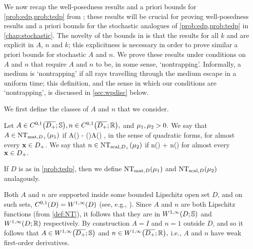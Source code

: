   We  now recap the well-posedness results and a priori bounds for \cref{prob:edp,prob:tedp} from \cite{GrPeSp:19}; these results will be crucial for proving well-posedness results and a priori bounds for the stochastic analogues of \cref{prob:edp,prob:tedp} in \cref{chap:stochastic}. The novelty of the bounds in \cite{GrPeSp:19} is that the results for all $k$ and are explicit in $A$, $n$ and $k$; this explicitness is necessary in order to prove similar a priori bounds for stochastic $A$ and $n$. We prove these results under conditions on $A$ and $n$ that require $A$ and $n$ to be, in some sense, `nontrapping'. Informally, a medium is `nontrapping' if all rays travelling through the medium escape in a uniform time; this definition, and the sense in which our conditions are `nontrapping', is discussed in \cref{sec:wpdisc} below.

  We first define the classes of $A$ and $n$ that we consider.%

  
\label{def:NT}
Let $A \in \CzoDpclosRRdtd, n \in \CzoDpclosRR,$ and $\mu_{1}, \mu_{2} > 0.$ We say that $A \in \NTADp{\muo}$ if
\beqs
A(\bx) - \mleft(\bx \cdot \grad\mright)A(\bx) \geq \muo,
\eeqs
in the sense of quadratic forms, for almost every $\mathbf{x} \in D_{+}$. We say that $n \in \NTnDp{\mut}$ if
\beqs
n(\bx) + \bx \cdot \grad n(\bx) \geq \mut
\eeqs
for almost every $\mathbf{x} \in D_{+}.$

If $D$ is as in \cref{prob:tedp}, then we define $\NTAD{\muo}$ and $\NTnD{\mut}$ analagously.
\ede

Both $A$ and $n$ are supported inside some bounded Lipschitz open set $D$, and on such sets, $\CzoD = \WoiD$ (see, e.g., \cite[Section 4.2.3, Theorem 5]{EvGa:92}). Since $A$ and $n$ are both Lipschitz functions (from \cref{def:NT}), it follows that they are in $\WoiDRRdtd$ and $\WoiDRR$ respectively. By construction $A=I$ and $n=1$ outside $D$, and so it follows that $A \in \WoiDpclosRRdtd$ and $n \in \WoiDpclosRR,$ i.e., $A$ and $n$ have weak first-order derivatives.
\ere

